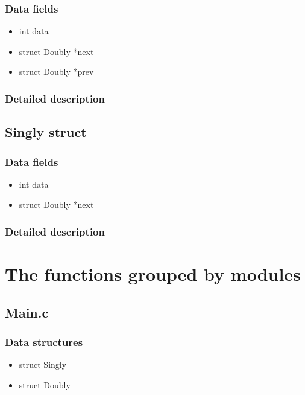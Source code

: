\subsubsection{Data fields}
\begin{itemize}
    \item int data
    \item struct Doubly *next
    \item struct Doubly *prev
\end{itemize}
\subsubsection{Detailed description}
\subsection{Singly struct}
\subsubsection{Data fields}
\begin{itemize}
    \item int data
    \item struct Doubly *next
\end{itemize}
\subsubsection{Detailed description}


\section{The functions grouped by modules}
\subsection{Main.c}
\subsubsection{Data structures}
\begin{itemize}
    \item struct Singly
    \item struct Doubly
\end{itemize}
